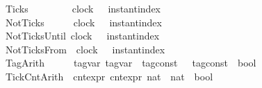 \begin{isabellebody}
{\isacharbar}\ Ticks\ \ \ \ \ \ \ \ \ {\isacartoucheopen}clock{\isacartoucheclose}\ \ \ {\isacartoucheopen}instant{\isacharunderscore}index{\isacartoucheclose}\ \ \ \ \ \ \ \ \ \ \ \ \ \ \ \ \ \ \ \ \ \ \ \ {\isacharparenleft}{\isachardoublequoteopen}{\isacharunderscore}\ {\isasymUp}\ {\isacharunderscore}{\isachardoublequoteclose}{\isacharparenright}\isanewline
{\isacharbar}\ NotTicks\ \ \ \ \ \ {\isacartoucheopen}clock{\isacartoucheclose}\ \ \ {\isacartoucheopen}instant{\isacharunderscore}index{\isacartoucheclose}\ \ \ \ \ \ \ \ \ \ \ \ \ \ \ \ \ \ \ \ \ \ \ \ {\isacharparenleft}{\isachardoublequoteopen}{\isacharunderscore}\ {\isasymnot}{\isasymUp}\ {\isacharunderscore}{\isachardoublequoteclose}{\isacharparenright}\isanewline
{\isacharbar}\ NotTicksUntil\ {\isacartoucheopen}clock{\isacartoucheclose}\ \ \ {\isacartoucheopen}instant{\isacharunderscore}index{\isacartoucheclose}\ \ \ \ \ \ \ \ \ \ \ \ \ \ \ \ \ \ \ \ \ \ \ \ {\isacharparenleft}{\isachardoublequoteopen}{\isacharunderscore}\ {\isasymnot}{\isasymUp}\ {\isacharless}\ {\isacharunderscore}{\isachardoublequoteclose}{\isacharparenright}\isanewline
{\isacharbar}\ NotTicksFrom\ \ {\isacartoucheopen}clock{\isacartoucheclose}\ \ \ {\isacartoucheopen}instant{\isacharunderscore}index{\isacartoucheclose}\ \ \ \ \ \ \ \ \ \ \ \ \ \ \ \ \ \ \ \ \ \ \ \ {\isacharparenleft}{\isachardoublequoteopen}{\isacharunderscore}\ {\isasymnot}{\isasymUp}\ {\isasymge}\ {\isacharunderscore}{\isachardoublequoteclose}{\isacharparenright}\isanewline
{\isacharbar}\ TagArith\ \ \ \ \ \ {\isacartoucheopen}tag{\isacharunderscore}var{\isacartoucheclose}\ {\isacartoucheopen}tag{\isacharunderscore}var{\isacartoucheclose}\ {\isacartoucheopen}{\isacharparenleft}{\isacharprime}{\isasymtau}\ tag{\isacharunderscore}const\ {\isasymtimes}\ {\isacharprime}{\isasymtau}\ tag{\isacharunderscore}const{\isacharparenright}\ {\isasymRightarrow}\ bool{\isacartoucheclose}\ {\isacharparenleft}{\isachardoublequoteopen}{\isasymlfloor}{\isacharunderscore}{\isacharcomma}\ {\isacharunderscore}{\isasymrfloor}\ {\isasymin}\ {\isacharunderscore}{\isachardoublequoteclose}{\isacharparenright}\isanewline
{\isacharbar}\ TickCntArith\ \ {\isacartoucheopen}cnt{\isacharunderscore}expr{\isacartoucheclose}\ {\isacartoucheopen}cnt{\isacharunderscore}expr{\isacartoucheclose}\ {\isacartoucheopen}{\isacharparenleft}nat\ {\isasymtimes}\ nat{\isacharparenright}\ {\isasymRightarrow}\ bool{\isacartoucheclose}\ \ \ \ \ \ {\isacharparenleft}{\isachardoublequoteopen}{\isasymlceil}{\isacharunderscore}{\isacharcomma}\ {\isacharunderscore}{\isasymrceil}\ {\isasymin}\ {\isacharunderscore}{\isachardoublequoteclose}{\isacharparenright}\isanewline

\end{isabellebody}
